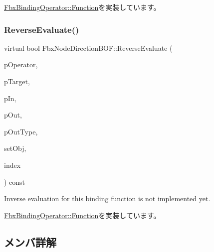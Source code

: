 \hyperlink{class_fbx_binding_operator_1_1_function_aa238a63d12508db3cb5c00a4b157524e}{Fbx\+Binding\+Operator\+::\+Function}を実装しています。

\mbox{\label{class_fbx_node_direction_b_o_f_ae550509066a010d97d92777df2cba41e}} 
\subsubsection{\texorpdfstring{Reverse\+Evaluate()}{ReverseEvaluate()}}
{\footnotesize\ttfamily virtual bool Fbx\+Node\+Direction\+B\+O\+F\+::\+Reverse\+Evaluate (\begin{DoxyParamCaption}\item[{const \hyperlink{class_fbx_binding_operator}{Fbx\+Binding\+Operator} $\ast$}]{p\+Operator,  }\item[{const \hyperlink{class_fbx_object}{Fbx\+Object} $\ast$}]{p\+Target,  }\item[{const void $\ast$}]{p\+In,  }\item[{void $\ast$$\ast$}]{p\+Out,  }\item[{\hyperlink{fbxpropertytypes_8h_a73913a5ddfb20e57c6f25e9e6784bd92}{E\+Fbx\+Type} $\ast$}]{p\+Out\+Type,  }\item[{bool}]{set\+Obj,  }\item[{int}]{index }\end{DoxyParamCaption}) const\hspace{0.3cm}{\ttfamily [virtual]}}



Inverse evaluation for this binding function is not implemented yet. 



\hyperlink{class_fbx_binding_operator_1_1_function_a9bbeec993a6e453a6569e7f40a85fd52}{Fbx\+Binding\+Operator\+::\+Function}を実装しています。



\subsection{メンバ詳解}
\mbox{\label{class_fbx_node_direction_b_o_f_a653e830c1b1480a48f55cd980fe54f91}} 
